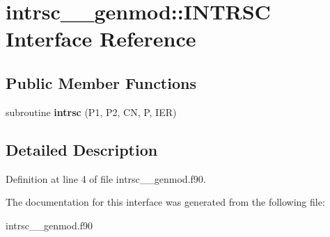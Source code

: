 \hypertarget{interfaceintrsc____genmod_1_1_i_n_t_r_s_c}{\section{intrsc\+\_\+\+\_\+genmod\+:\+:I\+N\+T\+R\+S\+C Interface Reference}
\label{interfaceintrsc____genmod_1_1_i_n_t_r_s_c}
}
\subsection*{Public Member Functions}
\begin{DoxyCompactItemize}
\item 
\hypertarget{interfaceintrsc____genmod_1_1_i_n_t_r_s_c_a8c27b227e739bf94c90d6ca61986bbdf}{subroutine {\bfseries intrsc} (P1, P2, C\+N, P, I\+E\+R)}\label{interfaceintrsc____genmod_1_1_i_n_t_r_s_c_a8c27b227e739bf94c90d6ca61986bbdf}

\end{DoxyCompactItemize}


\subsection{Detailed Description}


Definition at line 4 of file intrsc\+\_\+\+\_\+genmod.\+f90.



The documentation for this interface was generated from the following file\+:\begin{DoxyCompactItemize}
\item 
intrsc\+\_\+\+\_\+genmod.\+f90\end{DoxyCompactItemize}
